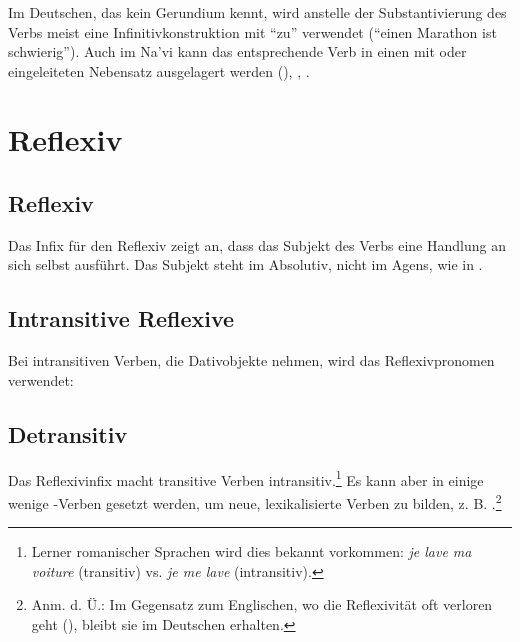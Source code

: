 \subsubsection{} Im Deutschen, das kein Gerundium kennt, wird anstelle der Substantivierung des Verbs meist eine Infinitivkonstruktion mit ``zu'' verwendet (``einen Marathon  ist schwierig''). Auch im Na'vi kann das entsprechende Verb in einen mit  oder  eingeleiteten Nebensatz ausgelagert werden (), , . 

\section{Reflexiv}
\subsection{Reflexiv} Das Infix für den Reflexiv  zeigt an, dass das Subjekt des Verbs eine Handlung an sich selbst ausführt. Das Subjekt steht im Absolutiv, nicht im Agens, wie in  .

\subsection{Intransitive Reflexive} Bei intransitiven Verben, die Dativobjekte nehmen, wird das Reflexivpronomen  verwendet:

\begin{quotation}
	\noindent{} 
\end{quotation} 
\noindent {}

\subsection{Detransitiv} Das Reflexivinfix macht transitive Verben intransitiv.\footnote{Lerner romanischer Sprachen wird dies bekannt vorkommen: \textit{je lave ma voiture} (transitiv) vs. \textit{je me lave} (intransitiv).} Es kann aber in einige wenige -Verben gesetzt werden, um neue, lexikalisierte Verben zu bilden, z. B.  .\footnote{Anm. d. Ü.: Im Gegensatz zum Englischen, wo die Reflexivität oft verloren geht (), bleibt sie im Deutschen erhalten.}

